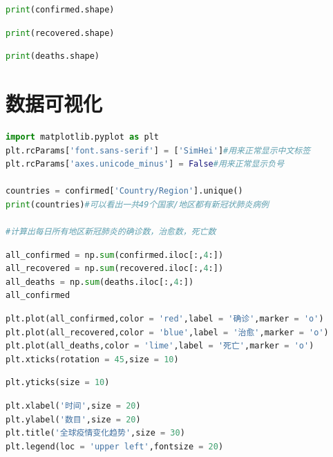 \documentclass[UTF8,a4paper,12pt]{ctexart}  %
\begin{document}
\begin{lstlisting}[language=Python]
print(confirmed.shape)
\end{lstlisting}

\begin{lstlisting}[language=Python]
print(recovered.shape)
\end{lstlisting}

\begin{lstlisting}[language=Python]
print(deaths.shape)
\end{lstlisting}

\section{数据可视化}

\begin{lstlisting}[language=Python]
import matplotlib.pyplot as plt
plt.rcParams['font.sans-serif'] = ['SimHei']#用来正常显示中文标签
plt.rcParams['axes.unicode_minus'] = False#用来正常显示负号

countries = confirmed['Country/Region'].unique()
print(countries)#可以看出一共49个国家/地区都有新冠状肺炎病例

#计算出每日所有地区新冠肺炎的确诊数，治愈数，死亡数
\end{lstlisting}

\begin{lstlisting}[language=Python]
all_confirmed = np.sum(confirmed.iloc[:,4:])
all_recovered = np.sum(recovered.iloc[:,4:])
all_deaths = np.sum(deaths.iloc[:,4:])
all_confirmed
\end{lstlisting}

\begin{lstlisting}[language=Python]
plt.plot(all_confirmed,color = 'red',label = '确诊',marker = 'o')
plt.plot(all_recovered,color = 'blue',label = '治愈',marker = 'o')
plt.plot(all_deaths,color = 'lime',label = '死亡',marker = 'o')
plt.xticks(rotation = 45,size = 10)
\end{lstlisting}

\begin{lstlisting}[language=Python]
plt.yticks(size = 10)
\end{lstlisting}

\begin{lstlisting}[language=Python]
plt.xlabel('时间',size = 20)
plt.ylabel('数目',size = 20)
plt.title('全球疫情变化趋势',size = 30)
plt.legend(loc = 'upper left',fontsize = 20)
\end{lstlisting}
\end{document}

